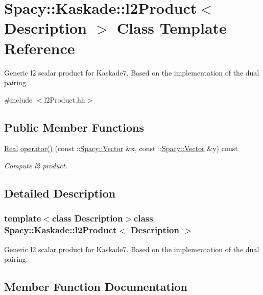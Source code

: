 \hypertarget{classSpacy_1_1Kaskade_1_1l2Product}{}\section{Spacy\+:\+:Kaskade\+:\+:l2\+Product$<$ Description $>$ Class Template Reference}
\label{classSpacy_1_1Kaskade_1_1l2Product}


Generic l2 scalar product for Kaskade7. Based on the implementation of the dual pairing.  




{\ttfamily \#include $<$l2\+Product.\+hh$>$}

\subsection*{Public Member Functions}
\begin{DoxyCompactItemize}
\item 
\hyperlink{classSpacy_1_1Real}{Real} \hyperlink{classSpacy_1_1Kaskade_1_1l2Product_a22732c1b32cd7eb8a1792440e7298002_a22732c1b32cd7eb8a1792440e7298002}{operator()} (const \+::\hyperlink{classSpacy_1_1Vector}{Spacy\+::\+Vector} \&x, const \+::\hyperlink{classSpacy_1_1Vector}{Spacy\+::\+Vector} \&y) const 
\begin{DoxyCompactList}\small\item\em Compute l2 product. \end{DoxyCompactList}\end{DoxyCompactItemize}


\subsection{Detailed Description}
\subsubsection*{template$<$class Description$>$class Spacy\+::\+Kaskade\+::l2\+Product$<$ Description $>$}

Generic l2 scalar product for Kaskade7. Based on the implementation of the dual pairing. 

\subsection{Member Function Documentation}
\hypertarget{classSpacy_1_1Kaskade_1_1l2Product_a22732c1b32cd7eb8a1792440e7298002_a22732c1b32cd7eb8a1792440e7298002}{}
